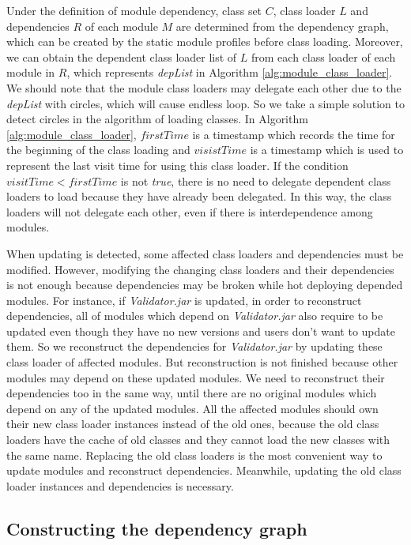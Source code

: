 \documentclass[conference]{IEEEtran}
\begin{document}
Under the definition of module dependency, class set $C$, class loader $L$ and dependencies $R$ of each module $M$ are determined from the dependency graph, which can be created by the static module profiles before class loading.
Moreover, we can obtain the dependent class loader list of $L$ from each class loader of each module in $R$, which represents \emph{depList} in Algorithm \ref{alg:module_class_loader}. 
We should note that the module class loaders may delegate each other due to the \emph{depList} with circles, which will cause endless loop.
So we take a simple solution to detect circles in the algorithm of loading classes.
In Algorithm \ref{alg:module_class_loader}, $firstTime$ is a timestamp which records the time for the beginning of the class loading and $visistTime$ is a timestamp which is used to represent the last visit time for using this class loader. 
If the condition $visitTime < firstTime$ is not \emph{true}, there is no need to delegate dependent class loaders to load because they have already been delegated.
In this way, the class loaders will not delegate each other, even if there is interdependence among modules.

When updating is detected, some affected class loaders and dependencies must be modified.
However, modifying the changing class loaders and their dependencies is not enough because dependencies may be broken while hot deploying depended modules.
For instance, if \emph{Validator.jar} is updated, in order to reconstruct dependencies, all of modules which depend on \emph{Validator.jar} also require to be updated even though they have no new versions and users don't want to update them.
So we reconstruct the dependencies for \emph{Validator.jar} by updating these class loader of affected modules.
But reconstruction is not finished because other modules may depend on these updated modules.
We need to reconstruct their dependencies too in the same way, until there are no original modules which depend on any of the updated modules.
All the affected modules should own their new class loader instances instead of the old ones, because the old class loaders have the cache of old classes and they cannot load the new classes with the same name.
Replacing the old class loaders is the most convenient way to update modules and reconstruct dependencies.
Meanwhile, updating the old class loader instances and dependencies is necessary.



\subsection{Constructing the dependency graph}
\end{document}

